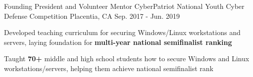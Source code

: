 \begin{cventries}
  \cventry
    {Founding President and Volunteer Mentor} %
    {CyberPatriot National Youth Cyber Defense Competition} %
    {Placentia, CA} %
    {Sep. 2017 - Jun. 2019} %
    {
      \begin{cvitems} %
        \item {Developed teaching curriculum for securing Windows/Linux workstations and servers, laying foundation for \textbf{multi-year national semifinalist ranking}}
        \item {Taught \textbf{70+} middle and high school students how to secure Windows and Linux workstations/servers, helping them achieve national semifinalist rank}
      \end{cvitems}
    }

\end{cventries}
